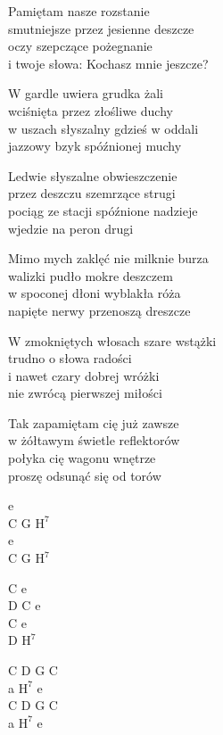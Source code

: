 \begin{text}
    Pamiętam nasze rozstanie\\
    smutniejsze przez jesienne deszcze\\
    oczy szepczące pożegnanie\\
    i twoje słowa: Kochasz mnie jeszcze?

    W gardle uwiera grudka żali\\
    wciśnięta przez złośliwe duchy\\
    w uszach słyszalny gdzieś w oddali\\
    jazzowy bzyk spóźnionej muchy

    Ledwie słyszalne obwieszczenie\\
    przez deszczu szemrzące strugi\\
    pociąg ze stacji spóźnione nadzieje\\
    wjedzie na peron drugi

    Mimo mych zaklęć nie milknie burza\\
    walizki pudło mokre deszczem\\
    w spoconej dłoni wyblakła róża\\
    napięte nerwy przenoszą dreszcze

    W zmokniętych włosach szare wstążki\\
    trudno o słowa radości\\
    i nawet czary dobrej wróżki\\
    nie zwrócą pierwszej miłości

    Tak zapamiętam cię już zawsze\\
    w żółtawym świetle reflektorów\\
    połyka cię wagonu wnętrze\\
    proszę odsunąć się od torów
\end{text}
\begin{chord}
    e\\
    C G $\mathrm{H^{7}}$\\
    e\\
    C G $\mathrm{H^{7}}$

    C e\\
    D C e\\
    C e\\
    D $\mathrm{H^{7}}$

    C D G C\\
    a $\mathrm{H^{7}}$ e\\
    C D G C\\
    a $\mathrm{H^{7}}$ e
\end{chord}

